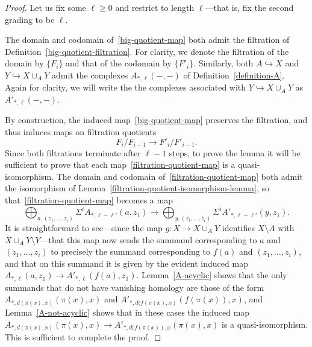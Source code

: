 \documentclass[a4paper, 11 pt, oneside, reqno]{amsart}
\numberwithin{lemma}{section}
\theoremstyle{definition}
\begin{document}
\begin{proof}
    Let us fix some \(\ell \geq 0\) and restrict to length \(\ell\)---that is, fix the second grading to be \(\ell\).
    
    The domain and codomain of~\eqref{big-quotient-map}
    both admit the filtration of 
    Definition~\ref{big-quotient-filtration}.
    For clarity, we denote the filtration of the domain by
    $\{F_i\}$ and that of the codomain by
    $\{F'_i\}$.
    Similarly, both $A\hookrightarrow X$ 
    and $Y\hookrightarrow X\cup_A Y$
    admit the complexes $A_{\ast,\ell}(-,-)$ of 
    Definition~\ref{definition-A}.
    Again for clarity, we will write the the complexes
    associated with $Y\hookrightarrow X\cup_A Y$ 
    as $A'_{\ast,\ell}(-,-)$.
    
    By construction, the induced map~\eqref{big-quotient-map}
    preserves the filtration, 
    and thus induces maps on filtration quotients
    \begin{equation}\label{filtration-quotient-map}
        F_i/F_{i-1}\longrightarrow F'_i/F'_{i-1}.
    \end{equation}
    Since both filtrations terminate after $\ell-1$ steps,
    to prove the lemma it will be sufficient to prove that each
    map~\eqref{filtration-quotient-map} is a quasi-isomorphism.
    The domain and codomain 
    of~\eqref{filtration-quotient-map}
    both admit the isomorphism of 
    Lemma~\ref{filtration-quotient-isomorphism-lemma},
    so that~\eqref{filtration-quotient-map}
    becomes a map
    \begin{equation}\label{filtration-quotient-map-two}
        \bigoplus_{a,(z_1,\ldots,z_i)}
        \Sigma^i A_{\ast,\ell-\ell'}(a,z_1)
        \longrightarrow
        \bigoplus_{y,(z_1,\ldots,z_i)}
        \Sigma^i A'_{\ast,\ell-\ell'}(y,z_1).
    \end{equation}
    It is straightforward to see---since the map
    $g\colon X\to X\cup_A Y$ identifies
    $X\setminus A$ with $X\cup_A Y \setminus Y$---that this map now sends the summand corresponding to
    $a$ and $(z_1,\ldots,z_i)$ to precisely the summand
    corresponding to $f(a)$ and $(z_1,\ldots,z_i)$,
    and that on this summand it is given by the evident induced
    map
    $A_{\ast,\ell}(a,z_1)\to A'_{\ast,\ell}(f(a),z_1)$.
    Lemma~\ref{A-acyclic} shows that the only summands that do
    not have vanishing homology are those of the form
    $A_{\ast,d(\pi(x),x)}(\pi(x),x)$
    and
    $A'_{\ast,d(f(\pi(x),x)}(f(\pi(x)),x)$,
    and Lemma~\ref{A-not-acyclic} 
    shows that in these cases the induced map
    $A_{\ast,d(\pi(x),x)}(\pi(x),x)
    \to 
    A'_{\ast,d(f(\pi(x)),x}(\pi(x),x)$
    is a quasi-isomorphism.
    This is sufficient to complete the proof.
\end{proof}
\end{document}

